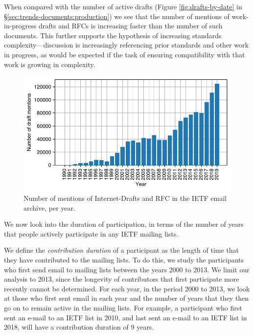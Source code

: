 \documentclass[twocolumn,10pt]{article}
\newlength{\figureWidthOneColumn}
\newcommand{\pb}[1]{\vspace{0.75ex}\noindent{\textbf{#1}}}
\begin{document}

When compared with the number of active drafts (Figure \ref{fig:drafts-by-date}
in \S\ref{sec:trends-documents:production}) we see that the number of mentions
of work-in-progress drafts and RFCs is increasing faster than the number of
such documents. This further supports the hypothesis of increasing standards
complexity---discussion is increasingly referencing prior standards and
other work in progress, as would be expected if the task of ensuring
compatibility with that work is growing in complexity.


\begin{figure}
  \centering
  \includegraphics[width=\figureWidthOneColumn]{figures-prev/imc-2021/emails/yearly-draft-mention-volume.pdf}
  \caption{
    Number of mentions of Internet-Drafts and RFC in the IETF email
    archive, per year.
  }
  \label{fig:draft_mentions}
\end{figure}

\pb{Duration of Participation:}
We now look into the duration of participation, in terms of the number of
years that people actively participate in any IETF mailing lists.

We define the \textit{contribution duration} of a participant as the length
of time that they have contributed to the mailing lists.  To do this, we
study the participants who first send email to mailing lists between the
years 2000 to 2013. We limit our analysis to 2013, since the longevity of
contributors that first participate more recently cannot be determined.
For each year, in the period 2000 to 2013, we look at those who first
sent email in each year and the number of years that they then go on to
remain active in the mailing lists. For example, a participant who first
sent an e-mail to an IETF list in 2010, and last sent an e-mail to an IETF
list in 2018, will have a contribution duration of 9 years.
\end{document}
